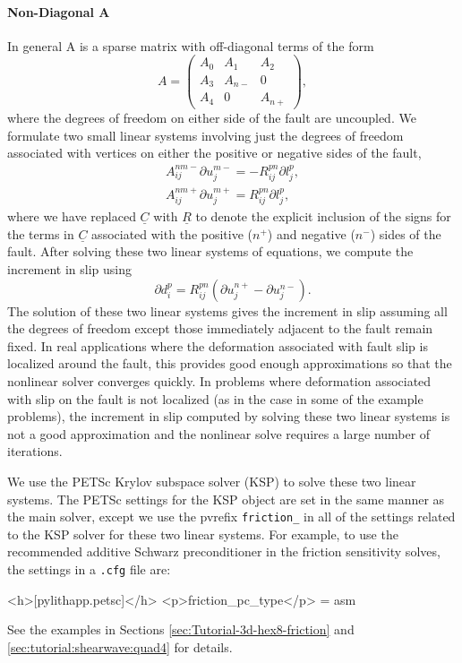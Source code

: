 \paragraph{Non-Diagonal A}

In general A is a sparse matrix with off-diagonal terms of the form
\begin{equation}
A=\left(\begin{array}{ccc}
A_{0} & A_{1} & A_{2}\\
A_{3} & A_{n-} & 0\\
A_{4} & 0 & A_{n+}
\end{array}\right),
\end{equation}
where the degrees of freedom on either side of the fault are uncoupled.
We formulate two small linear systems involving just the degrees of
freedom associated with vertices on either the positive or negative
sides of the fault,
\begin{gather}
A_{ij}^{nm-}\partial u_{j}^{m-}=-R_{ij}^{pn}\partial l_{j}^{p},\\
A_{ij}^{nm+}\partial u_{j}^{m+}=R_{ij}^{pn}\partial l_{j}^{p},
\end{gather}
where we have replaced $\underline{C}$ with $\underline{R}$ to denote
the explicit inclusion of the signs for the terms in $\underline{C}$
associated with the positive ($n^{+}$) and negative ($n^{-}$) sides
of the fault. After solving these two linear systems of equations,
we compute the increment in slip using
\begin{equation}
\partial d_{i}^{p}=R_{ij}^{pn}(\partial u_{j}^{n+}-\partial u_{j}^{n-}).
\end{equation}
The solution of these two linear systems gives the increment in slip
assuming all the degrees of freedom except those immediately adjacent
to the fault remain fixed. In real applications where the deformation
associated with fault slip is localized around the fault, this provides
good enough approximations so that the nonlinear solver converges
quickly. In problems where deformation associated with slip on the
fault is not localized (as in the case in some of the example problems),
the increment in slip computed by solving these two linear systems
is not a good approximation and the nonlinear solve requires a large
number of iterations.

We use the PETSc Krylov subspace solver (KSP) to solve these two linear
systems. The PETSc settings for the KSP object are set in the same
manner as the main solver, except we use the pvrefix \texttt{friction\_}
in all of the settings related to the KSP solver for these two linear
systems. For example, to use the recommended additive Schwarz preconditioner
in the friction sensitivity solves, the settings in a \texttt{.cfg}
file are:
\begin{cfg}
<h>[pylithapp.petsc]</h>
<p>friction_pc_type</p> = asm
\end{cfg}
See the examples in Sections \vref{sec:Tutorial-3d-hex8-friction}
and \vref{sec:tutorial:shearwave:quad4} for details.


